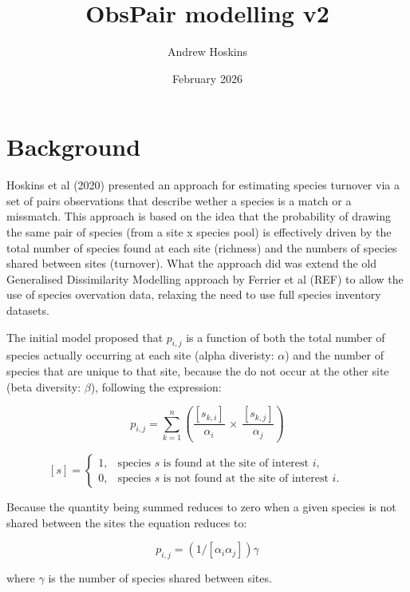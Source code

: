 \documentclass{article}
\title{ObsPair modelling v2}
\author{Andrew Hoskins}
\date{February 2026}
\begin{document}
\maketitle

\section{Background}

Hoskins et al (2020) presented an approach for estimating species turnover via a set of pairs observations that describe wether a species is a match or a missmatch. This approach is based on the idea that the probability of drawing the same pair of species (from a site x species pool) is effectively driven by the total number of species found at each site (richness) and the numbers of species shared between sites (turnover). What the approach did was extend the old Generalised Dissimilarity Modelling approach by Ferrier et al (REF) to allow the use of species overvation data, relaxing the need to use full species inventory datasets.

The initial model proposed that $p_{i,j}$ is a function of both the total number of species actually occurring at each site (alpha diveristy: $\alpha$) and the number of species that are unique to that site, because the do not occur at the other site (beta diversity: $\beta$), following the expression:

\begin{equation}
    p_{i,j}
    = \sum_{k=1}^{n}
    \left(
    \frac{\left[s_{k,i}\right]}{\alpha_i}
    \,\times\,
    \frac{\left[s_{k,j}\right]}{\alpha_j}
    \right)
\end{equation}


\[
\left[s\right] =
\begin{cases}
1, & \text{species } s \text{ is found at the site of interest } i,\\
0, & \text{species } s \text{ is not found at the site of interest } i.
\end{cases}
\qquad
\]

Because the quantity being summed reduces to zero when a given species is not shared between the sites the equation reduces to:

\begin{equation}
    p_{i,j}
    = (1/[\alpha_i\alpha_j])\gamma
\end{equation}

where $\gamma$ is the number of species shared between sites.
\end{document}
